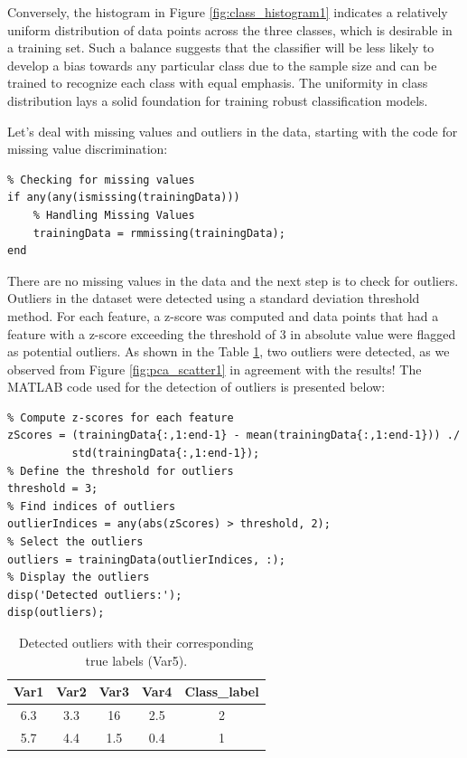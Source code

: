 \documentclass[12pt, onecolumn]{article}
\begin{document}
Conversely, the histogram in Figure \ref{fig:class_histogram1} indicates a relatively uniform distribution of data points across the three classes, which is desirable in a training set. Such a balance suggests that the classifier will be less likely to develop a bias towards any particular class due to the sample size and can be trained to recognize each class with equal emphasis. The uniformity in class distribution lays a solid foundation for training robust classification models.

Let's deal with missing values and outliers in the data, starting with the code for missing value discrimination:
\begin{verbatim}
% Checking for missing values
if any(any(ismissing(trainingData)))
    % Handling Missing Values
    trainingData = rmmissing(trainingData);
end
\end{verbatim}

There are no missing values in the data and the next step is to check for outliers. Outliers in the dataset were detected using a standard deviation threshold method. For each feature, a z-score was computed and data points that had a feature with a z-score exceeding the threshold of 3 in absolute value were flagged as potential outliers. As shown in the Table \ref{tab:outliers}, two outliers were detected, as we observed from Figure \ref{fig:pca_scatter1} in agreement with the results! The MATLAB code used for the detection of outliers is presented below:

\begin{verbatim}
% Compute z-scores for each feature
zScores = (trainingData{:,1:end-1} - mean(trainingData{:,1:end-1})) ./ 
          std(trainingData{:,1:end-1});
% Define the threshold for outliers
threshold = 3;
% Find indices of outliers
outlierIndices = any(abs(zScores) > threshold, 2);
% Select the outliers
outliers = trainingData(outlierIndices, :);
% Display the outliers
disp('Detected outliers:');
disp(outliers);
\end{verbatim}


\begin{table}[ht]
\centering
\caption{Detected outliers with their corresponding true labels (Var5).}
\label{tab:outliers}
\begin{tabular}{ccccc}
\toprule
Var1 & Var2 & Var3 & Var4 & Class\_label \\
\midrule
6.3 & 3.3 & 16 & 2.5 & 2 \\
5.7 & 4.4 & 1.5 & 0.4 & 1 \\
\bottomrule
\end{tabular}
\end{table}
\end{document}

